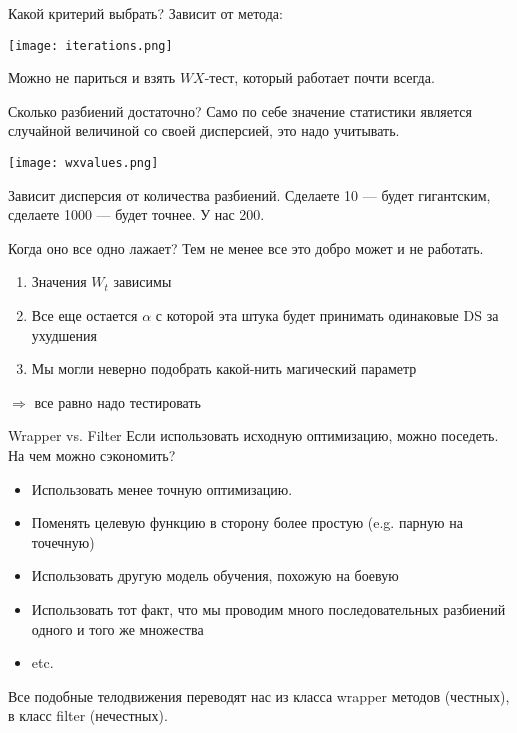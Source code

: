 \documentclass[14pt, fleqn, xcolor={dvipsnames, table}]{beamer}
\begin{document}
\begin{frame}{Какой критерий выбрать?}{}
Зависит от метода:
\begin{center}
\texttt{[image: iterations.png]}
\end{center}
Можно не париться и взять $WX$-тест, который работает почти всегда. 
\end{frame}

\begin{frame}{Сколько разбиений достаточно?}
\small
Само по себе значение статистики является случайной величиной со своей дисперсией, это надо учитывать.
\begin{center}
\texttt{[image: wxvalues.png]}
\end{center}
Зависит дисперсия от количества разбиений. Сделаете 10 --- будет гигантским, сделаете 1000 --- будет точнее. У нас 200. 
\end{frame}

\begin{frame}{Когда оно все одно лажает?}
Тем не менее все это добро может и не работать. 
\begin{enumerate}
  \item Значения $W_t$ зависимы
  \item Все еще остается $\alpha$ с которой эта штука будет принимать одинаковые DS за ухудшения
  \item Мы могли неверно подобрать какой-нить магический параметр
\end{enumerate}
$\Rightarrow$ все равно надо тестировать
\end{frame}

\begin{frame}{Wrapper vs. Filter}
\small
Если использовать исходную оптимизацию, можно поседеть. На чем можно сэкономить?
\begin{itemize}
  \item Использовать менее точную оптимизацию.
  \item Поменять целевую функцию в сторону более простую (e.g. парную на точечную)
  \item Использовать другую модель обучения, похожую на боевую
  \item Использовать тот факт, что мы проводим много последовательных разбиений одного и того же множества
  \item etc.
\end{itemize}
Все подобные телодвижения переводят нас из класса wrapper методов (честных), в класс filter (нечестных).
\end{frame}
\end{document}
